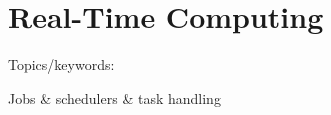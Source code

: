 \chapter{Real-Time Computing} \label{ch:realTimeComputing}

Topics/keywords:

Jobs \& schedulers \& task handling










